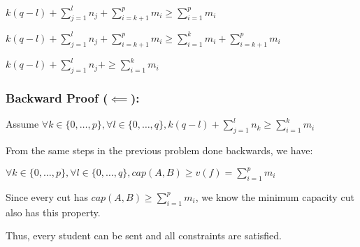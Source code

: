$k(q-l) + \sum_{j=1}^{l}n_j + \sum_{i=k+1}^{p} m_i \geq \sum_{i=1}^{p} m_i$

$k(q-l) + \sum_{j=1}^{l}n_j + \sum_{i=k+1}^{p} m_i \geq \sum_{i=1}^{k} m_i + \sum_{i=k+1}^{p} m_i$

$k(q-l) + \sum_{j=1}^{l}n_j +\geq \sum_{i=1}^{k} m_i$

\subsubsection*{Backward Proof ($\impliedby$):}
Assume $\forall k \in \{0, \dots, p\}, \forall l \in \{0, \dots, q\}, k(q-l) + \sum_{j=1}^{l} n_k \geq \sum_{i=1}^{k} m_i$

From the same steps in the previous problem done backwards, we have:

$\forall k \in \{0, \dots, p\}, \forall l \in \{0, \dots, q\}, cap(A,B) \geq v(f) = \sum_{i=1}^{p} m_i$

Since every cut has $cap(A,B) \geq \sum_{i=1}^{p} m_i$, we know the minimum capacity cut also has this property.

Thus, every student can be sent and all constraints are satisfied.
